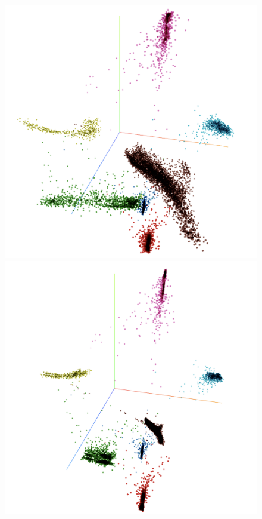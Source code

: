 \begin{figure}[H]
\centering \begin{minipage}[b]{0.45\linewidth}
  \includegraphics[width=\textwidth]{figures/tsne_embedding_projector_67}
\end{minipage}
\quad \begin{minipage}[b]{0.45\linewidth}
  \includegraphics[width=\textwidth]{figures/tsne_embedding_projector_102}

\end{minipage}
\end{figure}
